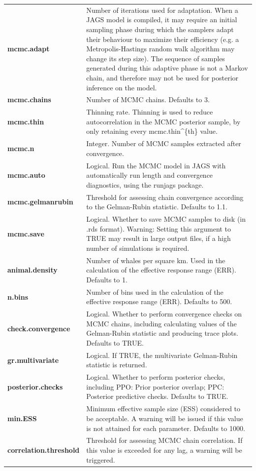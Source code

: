 \documentclass[
]{article}
\begin{document}
\begin{longtable}{>{\bfseries}l|>{\raggedright\arraybackslash}p{30em}}
mcmc.adapt & Number of iterations used for adaptation. When a JAGS model is compiled, it may require an initial sampling phase during which the samplers adapt their behaviour to maximize their efficiency (e.g. a Metropolis-Hastings random walk algorithm may change its step size). The sequence of samples generated during this adaptive phase is not a Markov chain, and therefore may not be used for posterior inference on the model.\\
\addlinespace
mcmc.chains & Number of MCMC chains. Defaults to 3.\\
mcmc.thin & Thinning rate. Thinning is used to reduce autocorrelation in the MCMC posterior sample, by only retaining every mcmc.thin\textasciicircum{}\{th\} value.\\
mcmc.n & Integer. Number of MCMC samples extracted after convergence.\\
mcmc.auto & Logical. Run the MCMC model in JAGS with automatically run length and convergence diagnostics, using the runjags package.\\
mcmc.gelmanrubin & Threshold for assessing chain convergence according to the Gelman-Rubin statistic. Defaults to 1.1.\\
\addlinespace
mcmc.save & Logical. Whether to save MCMC samples to disk (in .rds format). Warning: Setting this argument to TRUE may result in large output files, if a high number of simulations is required.\\
animal.density & Number of whales per square km. Used in the calculation of the effective response range (ERR). Defaults to 1.\\
n.bins & Number of bins used in the calculation of the effective response range (ERR). Defaults to 500.\\
check.convergence & Logical. Whether to perform convergence checks on MCMC chains, including calculating values of the Gelman-Rubin statistic and producing trace plots. Defaults to TRUE.\\
gr.multivariate & Logical. If TRUE, the multivariate Gelman-Rubin statistic is returned.\\
\addlinespace
posterior.checks & Logical. Whether to perform posterior checks, including PPO: Prior posterior overlap; PPC: Posterior predictive checks. Defaults to TRUE.\\
min.ESS & Minimum effective sample size (ESS) considered to be acceptable. A warning will be issued if this value is not attained for each parameter. Defaults to 1000.\\
correlation.threshold & Threshold for assessing MCMC chain correlation. If this value is exceeded for any lag, a warning will be triggered.\\

\end{longtable}
\end{document}
